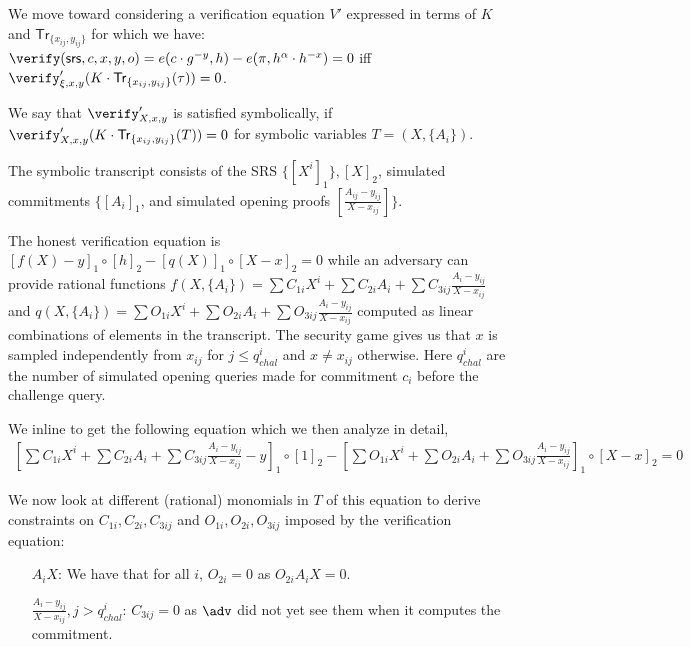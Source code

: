 \documentclass[runningheads,11pt]{llncs}
\begin{document}
We move toward considering a verification equation $V'$ expressed in terms of $K$ and $\mathsf{Tr}_{\{x_{ij},y_{ij}\}}$ for which we have:
$\verify(\srs,c,x,y,o) =  e(c \cdot  g^{-y}, h) - e(\pi , h^{\alpha}\cdot h^{-x}) = 0$ iff $\verify'_{{\xi,x,y}}(K \cdot \mathsf{Tr}_{\{x_{ij},y_{ij}\}} (\tau)) = 0$.

We say that $\verify'_{{X,x,y}}$ is satisfied symbolically, if $\verify'_{{X,x,y}}(K \cdot \mathsf{Tr}_{\{x_{ij},y_{ij}\}} (T)) = 0$ for symbolic variables $T=(X, \{A_{i}\})$.

The symbolic transcript consists of the SRS $\{[X^{i}]_{1}\}, [X]_{2}$, simulated commitments $\{[A_{i}]_{1}$, and simulated opening proofs $ [\frac{A_{ij}-y_{{ij}}}{X-x_{ij}}]\}$.

The honest verification equation is
$[f(X) - y]_1 \circ [h]_{2} - [q(X)]_1 \circ [X-x]_{2}=0$ while an adversary can
provide rational functions
$f(X, \{A_{i}\}) = \sum C_{1i} X^{i} + \sum C_{2i} A_{i} + \sum C_{3ij}
\frac{A_{i}-y_{ij}}{X-x_{ij}}$ and
$q(X, \{A_{i}\}) = \sum O_{1i} X^{i} + \sum O_{2i} A_{i} + \sum O_{3ij}
\frac{A_{i}- y_{ij}}{X-x_{ij}}$ computed as linear combinations of elements in the
transcript.
The security game gives us that $x$ is sampled independently from $x_{ij}$ for $j\leq q^{i}_{chal}$ and $x \neq x_{ij}$ otherwise. Here $q^{i}_{chal}$ are the number of simulated opening queries made for commitment $c_{i}$ before the challenge query.

We inline to get the following equation which we then analyze in detail,
\begin{align*}
  \left[\sum C_{1i} X^{i} + \sum C_{2i} A_{i} + \sum C_{3ij} \frac{A_{i}-y_{ij}}{X-x_{ij}} - y\right]_{1} \!\!\!\circ\! [1]_{2} - \left[\sum O_{1i} X^{i} + \sum O_{2i} A_{i} + \sum O_{3ij} \frac{A_{i}-y_{ij}}{X-x_{ij}}\right]_{1} \!\!\!\circ\! [X-x]_{2} = 0
  \end{align*}

We now look at different (rational) monomials in $T$ of this equation to derive constraints on $C_{1i}, C_{{2i}},C_{{3ij}}$ and $O_{1i},O_{2i},O_{3ij}$ imposed by the verification equation:
\begin{itemize}
  \item[$A_{i}X$:] We have that for all $i$, $O_{2i}=0$ as $O_{2i} A_{i} X = 0$.
  \item[$\frac{A_{i}-y_{ij}}{X-x_{ij}}, j>q^{i}_{chal}$:] $C_{3ij}=0$ as $\adv$ did not yet see them when it computes the commitment.
\end{itemize}
\end{document}
